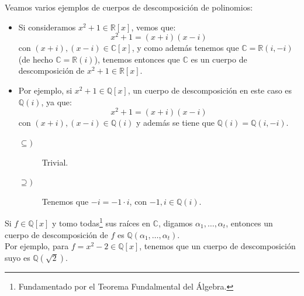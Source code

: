 \begin{ejemplo}
    Veamos varios ejemplos de cuerpos de descomposición de polinomios:
    \begin{itemize}
        \item Si consideramos $x^2+1\in \mathbb{R}[x]$, vemos que:
            \begin{equation*}
                x^2+1 = (x+i)(x-i)
            \end{equation*}
            con $(x+i),(x-i)\in \mathbb{C}[x]$, y como además tenemos que $\mathbb{C} = \mathbb{R}(i,-i)$ (de hecho $\mathbb{C} = \mathbb{R}(i)$), tenemos entonces que $\mathbb{C}$ es un cuerpo de descomposición de $x^2+1\in \mathbb{R}[x]$.
        \item Por ejemplo, si $x^2+1\in \mathbb{Q}[x]$, un cuerpo de descomposición en este caso es $\mathbb{Q}(i)$, ya que:
            \begin{equation*}
                x^2+1 = (x+i)(x-i)
            \end{equation*}
            con $(x+i),(x-i)\in \mathbb{Q}(i)$ y además se tiene que $\mathbb{Q}(i) = \mathbb{Q}(i,-i)$.
            \begin{description}
                \item [$\subseteq )$] Trivial.
                \item [$\supseteq )$] Tenemos que $-i = -1 \cdot i$, con $-1,i \in \mathbb{Q}(i)$.
            \end{description}
    \end{itemize}
\end{ejemplo}

\begin{observacion}
    Si $f\in \mathbb{Q}[x]$ y tomo todas\footnote{Fundamentado por el Teorema Fundalmental del Álgebra.} sus raíces en $\mathbb{C}$, digamos $\alpha_1,\ldots,\alpha_t$, entonces un cuerpo de descomposición de $f$ es $\mathbb{Q}(\alpha_1,\ldots,\alpha_t)$.\\

    \noindent
    Por ejemplo, para $f=x^2-2\in \mathbb{Q}[x]$, tenemos que un cuerpo de descomposición suyo es $\mathbb{Q}\left(\sqrt{2}\right)$.
\end{observacion}

